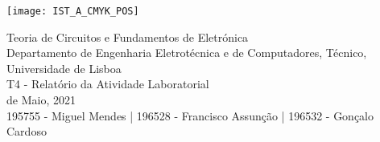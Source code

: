 
\thispagestyle {empty}

\texttt{[image: IST\_A\_CMYK\_POS]}

\begin{center}
%
\vspace{1.0cm}

\vspace{1cm}
{\FontLb Teoria de Circuitos e Fundamentos de Eletrónica} \\ %
\vspace{1cm}
{\FontSn Departamento de Engenharia Eletrotécnica e de Computadores, Técnico, Universidade de Lisboa} \\ %
\vspace{1cm}
{\FontSn T4 - Relatório da Atividade Laboratorial} \\
\vspace{1cm}
{ de Maio, 2021} \\ %
\vspace{1cm}
{195755 - Miguel Mendes |}
{196528 - Francisco Assunção |}
{196532 - Gonçalo Cardoso}

\end{center}